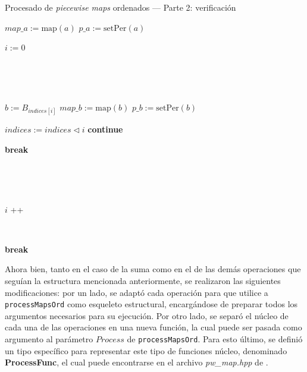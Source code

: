 \begin{algorithm}
\caption{Procesado de \textit{piecewise maps} ordenados — Parte 2: verificación}
\label{alg:processOrdMaps2}
\begin{algorithmic}[1]
        \State  $map\_a := \mathrm{map}(a)$
        \State  $p\_a := \mathrm{setPer}(a)$
    \

        \State $i := 0$
                
    \
    
                
    \
    
            \State $b := B_{indices[i]}$
            \State  $map\_b := \mathrm{map}(b)$
            \State  $p\_b := \mathrm{setPer}(b)$
    \
    
                \State $indices := indices 	\triangleleft  i$
                \State \textbf{continue}
            \EndIf

                \State \textbf{break}
            \EndIf

\
            
                \State {}
            \EndIf
        
    \
    
            \State $i$ \!+\!+ 
        \EndWhile
        
    \
    
            \State \textbf{break}
        \EndIf
    \EndFor
        
\EndFunction
\end{algorithmic}
\end{algorithm}


Ahora bien, tanto en el caso de la suma como en el de las demás operaciones que seguían la estructura mencionada anteriormente, se realizaron las siguientes modificaciones: por un lado, se adaptó cada operación para que utilice a \texttt{processMapsOrd} como esqueleto estructural, encargándose de preparar todos los argumentos necesarios para su ejecución. Por otro lado, se separó el núcleo de cada una de las operaciones en una nueva función, la cual puede ser pasada como argumento al parámetro $Process$ de \texttt{processMapsOrd}. Para esto último, se definió un tipo específico para representar este tipo de funciones núcleo, denominado \textbf{ProcessFunc}, el cual puede encontrarse en el archivo \textit{pw\_map.hpp} de \cite{sbg}.

